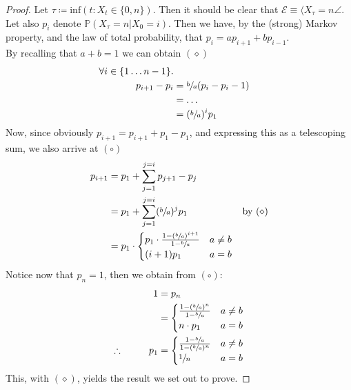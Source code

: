 		\begin{proof}
			Let $\tau \coloneqq \mathrm{inf}(t : X_t \in \{0, n\})$. Then it should be clear that
			$\mathcal{E} \equiv \langle X_\tau = n \angle$. Let also $p_i$ denote 
			$\mathbb{P}(X_\tau = n | X_0 = i)$. Then we have, by the (strong) Markov property, and 
			the law of total probability, that $p_i = ap_{i+1} + bp_{i-1}$. \\
			By recalling that $a+b = 1$ we can obtain $(\diamond)$
			\begin{align*}
				\forall i \in \{1 \hdots n-1\}. \\
				p_{i+1} - p_i &= \sfrac{b}{a} (p_i - p_i-1) \\
				              &= \hdots \\
				              &= (\sfrac{b}{a})^i p_1 \\
			\end{align*}
			Now, since obviously $p_{i+1} = p_{i+1} + p_{1} - p_1$, and expressing this as a 
			telescoping sum, we also arrive at $(\circ)$
			\begin{align*}
				p_{i+1} &= p_1 + \sum_{j=1}^{j=i} p_{j+1} - p_{j} \\
					&= p_1 + \sum_{j=1}^{j=i}(\sfrac{b}{a})^j p_1 & \text{by $(\diamond)$}\\
					&= p_1 \cdot 
					\begin{cases}
					p_1\cdot\frac{1-(\sfrac{b}{a})^{i+1}}{1-\sfrac{b}{a}} & a \neq b \\
						(i+1)p_1                                      & a = b
					\end{cases}
			\end{align*}
			Notice now that $p_n = 1$, then we obtain from $(\circ)$:
			\begin{align*}
				 1 &= p_n \\
				   &= 
			  	       \begin{cases}
			  	               \frac{1-(\sfrac{b}{a})^{n}}{1-\sfrac{b}{a}} & a \neq b \\
			  	               n\cdot p_1                                  & a = b
			  	       \end{cases}
				       \\
				\therefore \ \ \ \ \ \ \ \  
				p_1&= 	
			  	       \begin{cases}
			  	               \frac{1-\sfrac{b}{a}}{1-(\sfrac{b}{a})^{n}}   & a \neq b \\
			  	               \sfrac{1}{n}                                  & a = b
			  	       \end{cases}
			\end{align*}
			This, with $(\diamond)$, yields the result we set out to prove.
		\end{proof}


